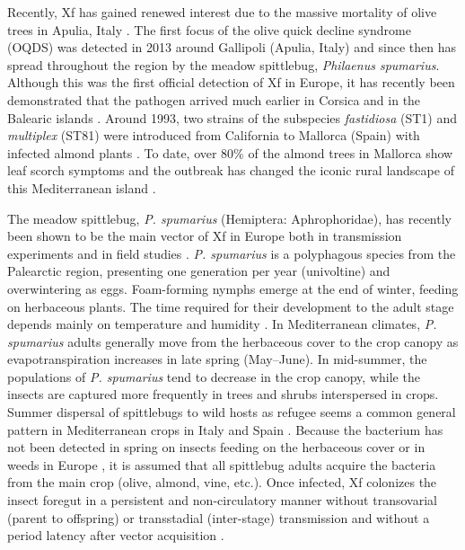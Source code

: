 Recently, Xf has gained renewed interest due to the massive mortality of
olive trees in Apulia, Italy \cite{saponari2019xylella}. The first focus of
the olive quick decline syndrome (OQDS) was detected in 2013 around Gallipoli
(Apulia, Italy)\cite{saponari2013identification} and since then has spread
throughout the region by the meadow spittlebug, \textit{Philaenus spumarius}.
Although this was the first official detection of Xf in Europe, it has recently
been demonstrated that the pathogen arrived much earlier in Corsica
\cite{Soubeyrand2018} and in the Balearic islands \cite{Moralejo2020}.
Around 1993, two strains of the subspecies \textit{fastidiosa} (ST1) and
\textit{multiplex} (ST81) were introduced from California to Mallorca (Spain)
with infected almond plants \cite{Moralejo2020}. To date, over 80\% of the
almond trees in Mallorca show leaf scorch symptoms and the outbreak has changed
the iconic rural landscape of this Mediterranean island \cite{Olmo2021b}.

The meadow spittlebug,	\textit{P. spumarius} (Hemiptera: Aphrophoridae),
has recently been shown to be the main vector of Xf in Europe both in
transmission experiments and in field studies
\cite{Cornara2017,Cornara2018,lopez2022mechanical,Moralejo2019,saponari2019xylella}.
\textit{P. spumarius} is a polyphagous species from the Palearctic region,
presenting one generation per year (univoltine) and overwintering as eggs.
Foam-forming nymphs emerge at the end of winter, feeding on herbaceous plants.
The time required for their development to the adult stage depends mainly on
temperature and humidity
\cite{bodino2019phenology,Chmiel1979,cornara2018philaenus}. In Mediterranean
climates,  \textit{P. spumarius} adults generally move from the herbaceous
cover to the crop canopy as evapotranspiration increases in late spring
(May–June). In mid-summer, the populations of \textit{P. spumarius} tend to
decrease in the crop canopy, while the insects are captured more frequently in
trees and shrubs interspersed in crops. Summer dispersal of spittlebugs to wild
hosts as refugee seems a common general pattern in Mediterranean crops in Italy
\cite{bodino2019phenology,cornara2021natural} and Spain
\cite{morente2018distribution}. Because the bacterium has not been detected
in spring on insects feeding on the herbaceous cover or in weeds in Europe
\cite{bodino2019phenology,cornara2018philaenus,Olmo2021b}, it is assumed that
all spittlebug adults acquire the bacteria from the main crop (olive, almond,
vine, etc.). Once infected, Xf colonizes the insect foregut in a persistent and
non-circulatory manner without transovarial (parent to offspring) or
transstadial (inter-stage) transmission
\cite{Almeida2003,freitag1951host,purcell1979evidence} and without
a period latency after vector acquisition \cite{Almeida2015,freitag1951host}.

